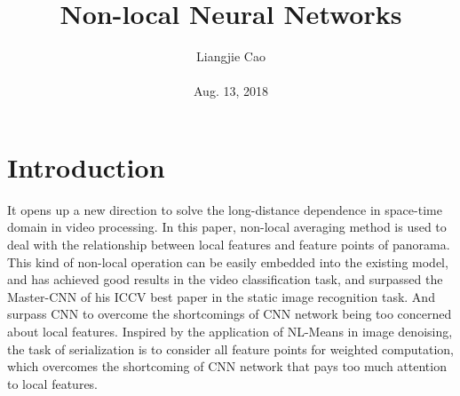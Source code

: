 \documentclass[10pt,twocolumn,letterpaper]{article}
\begin{document}
\title{\textbf{Non-local Neural Networks}}
\author{Liangjie Cao\\\\ Aug. 13, 2018}
\maketitle
\section{Introduction}
It opens up a new direction to solve the long-distance dependence in space-time domain in video processing. In this paper, non-local averaging method is used to deal with the relationship between local features and feature points of panorama. This kind of non-local operation can be easily embedded into the existing model, and has achieved good results in the video classification task, and surpassed the Master-CNN of his ICCV best paper in the static image recognition task. And surpass CNN to overcome the shortcomings of CNN network being too concerned about local features.
Inspired by the application of NL-Means in image denoising, the task of serialization is to consider all feature points for weighted computation, which overcomes the shortcoming of CNN network that pays too much attention to local features.
\end{document}
